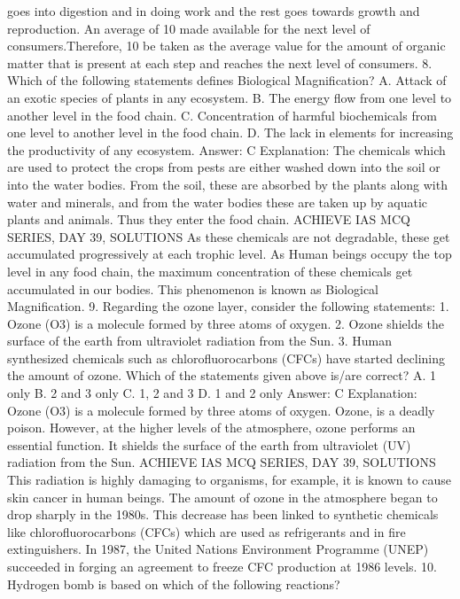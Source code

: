 goes into digestion and in doing work and the rest goes towards
growth and reproduction.
An average of 10%
made available for the next level of consumers.Therefore, 10%
be taken as the average value for the amount of organic matter that
is present at each step and reaches the next level of consumers.
8. Which of the following statements defines Biological
Magnification?
A. Attack of an exotic species of plants in any ecosystem.
B. The energy flow from one level to another level in the food chain.
C. Concentration of harmful biochemicals from one level to another
level in the food chain.
D. The lack in elements for increasing the productivity of any
ecosystem.
Answer: C
Explanation: The chemicals which are used to protect the crops
from pests are either washed down into the soil or into the water
bodies.
From the soil, these are absorbed by the plants along with water and
minerals, and from the water bodies these are taken up by aquatic
plants and animals. Thus they enter the food chain.
ACHIEVE IAS MCQ SERIES, DAY 39, SOLUTIONS
As these chemicals are not degradable, these get accumulated
progressively at each trophic level. As Human beings occupy the top
level in any food chain, the maximum concentration of these
chemicals get accumulated in our bodies. This phenomenon is known
as Biological Magnification.
9. Regarding the ozone layer, consider the following statements:
1. Ozone (O3) is a molecule formed by three atoms of oxygen.
2. Ozone shields the surface of the earth from ultraviolet radiation
from the Sun.
3. Human synthesized chemicals such as chlorofluorocarbons (CFCs)
have started declining the amount of ozone.
Which of the statements given above is/are correct?
A. 1 only
B. 2 and 3 only
C. 1, 2 and 3
D. 1 and 2 only
Answer: C
Explanation: Ozone (O3) is a molecule formed by three atoms of
oxygen. Ozone, is a deadly poison. However, at the higher levels of
the atmosphere, ozone performs an essential function. It shields the
surface of the earth from ultraviolet (UV) radiation from the Sun.
ACHIEVE IAS MCQ SERIES, DAY 39, SOLUTIONS
This radiation is highly damaging to organisms, for example, it is
known to cause skin cancer in human beings. The amount of ozone in
the atmosphere began to drop sharply in the 1980s. This decrease
has been linked to synthetic chemicals like chlorofluorocarbons
(CFCs) which are used as refrigerants and in fire extinguishers. In
1987, the United Nations Environment Programme (UNEP) succeeded
in forging an agreement to freeze CFC production at 1986 levels.
10. Hydrogen bomb is based on which of the following reactions?
